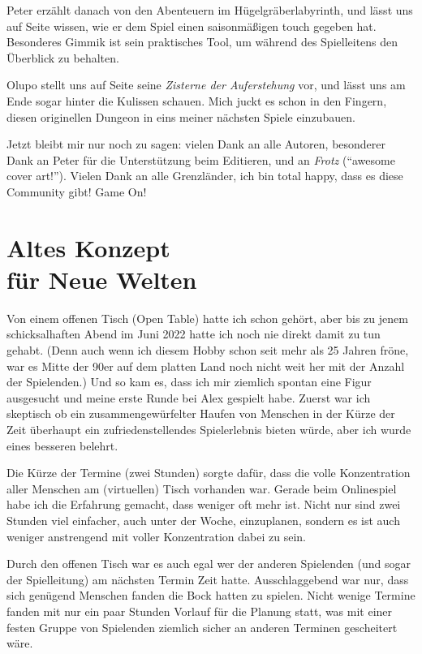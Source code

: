 \documentclass[11pt]{wbzine}
\begin{document}
\begin{multicols}{2}
Peter erzählt danach von den Abenteuern im Hügelgräberlabyrinth, und
lässt uns auf Seite \pageref{halloween} wissen, wie er dem Spiel
einen saisonmäßigen touch gegeben hat. Besonderes Gimmik ist 
sein praktisches Tool, um während des Spielleitens den Überblick zu
behalten.

Olupo stellt uns auf Seite \pageref{zisterne} seine \textit{Zisterne
der Auferstehung} vor, und lässt uns am Ende sogar hinter die
Kulissen schauen. Mich juckt es schon in den Fingern, diesen
originellen Dungeon in eins meiner nächsten Spiele einzubauen.

Jetzt bleibt mir nur noch zu sagen: vielen Dank an alle Autoren,
besonderer Dank an Peter für die Unterstützung beim Editieren, und
an \textit{Frotz} (``awesome cover art!''). Vielen Dank an alle
Grenzländer, ich bin total happy, dass es diese Community gibt! Game
On!

\section{Altes Konzept\\ für Neue Welten}
\label{altes-konzept}
Von einem offenen Tisch (Open Table) hatte ich schon gehört, aber bis
zu jenem schicksalhaften Abend im Juni 2022 hatte ich noch nie direkt
damit zu tun gehabt. (Denn auch wenn ich diesem Hobby schon seit mehr
als 25 Jahren fröne, war es Mitte der 90er auf dem platten Land noch
nicht weit her mit der Anzahl der Spielenden.) Und so kam es, dass ich
mir ziemlich spontan eine Figur ausgesucht und meine erste Runde bei Alex
gespielt habe. Zuerst war ich skeptisch ob ein zusammengewürfelter Haufen
von Menschen in der Kürze der Zeit überhaupt ein zufriedenstellendes
Spielerlebnis bieten würde, aber ich wurde eines besseren belehrt.

Die Kürze der Termine (zwei Stunden) sorgte dafür, dass die volle
Konzentration aller Menschen am (virtuellen) Tisch vorhanden war. Gerade
beim Onlinespiel habe ich die Erfahrung gemacht, dass weniger oft
mehr ist. Nicht nur sind zwei Stunden viel einfacher, auch unter der
Woche, einzuplanen, sondern es ist auch weniger anstrengend mit voller
Konzentration dabei zu sein.

Durch den offenen Tisch war es auch egal wer der anderen Spielenden (und
sogar der Spielleitung) am nächsten Termin Zeit hatte. Ausschlaggebend
war nur, dass sich genügend Menschen fanden die Bock hatten zu
spielen. Nicht wenige Termine fanden mit nur ein paar Stunden Vorlauf
für die Planung statt, was mit einer festen Gruppe von Spielenden
ziemlich sicher an anderen Terminen gescheitert wäre.


\end{multicols}
\end{document}
